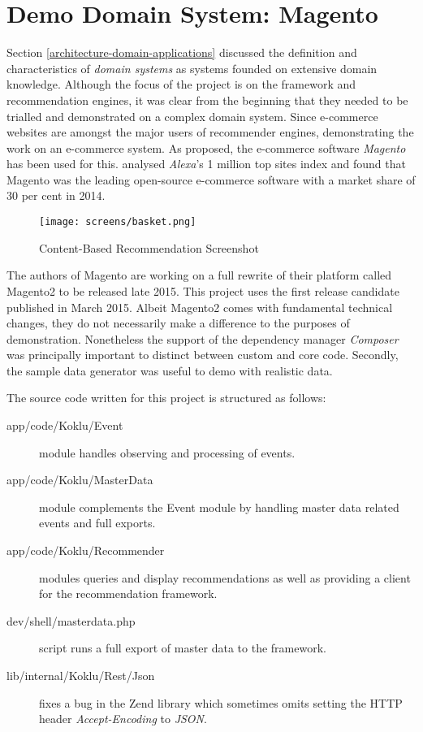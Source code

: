\section{Demo Domain System: Magento}

Section \ref{architecture-domain-applications} discussed the definition and characteristics of \emph{domain systems} as systems founded on extensive domain knowledge. Although the focus of the project is on the framework and recommendation engines, it was clear from the beginning that they needed to be trialled and demonstrated on a complex domain system. Since e-commerce websites are amongst the major users of recommender engines, demonstrating the work on an e-commerce system. As proposed, the e-commerce software \emph{Magento} has been used for this. \citet{aheadworks14} analysed \emph{Alexa}'s 1 million top sites index and found that Magento was the leading open-source e-commerce software with a market share of 30 per cent in 2014.

\begin{figure}[!ht]
    \texttt{[image: screens/basket.png]}
    \caption{Content-Based Recommendation Screenshot}
    \label{fig:implementation-magento-basket}
\end{figure}

The authors of Magento are working on a full rewrite of their platform called Magento2 to be released late 2015. This project uses the first release candidate published in March 2015. Albeit Magento2 comes with fundamental technical changes, they do not necessarily make a difference to the purposes of demonstration. Nonetheless the support of the dependency manager \emph{Composer} was principally important to distinct between custom and core code. Secondly, the sample data generator was useful to demo with realistic data.

The source code written for this project is structured as follows:

\begin{description}
    \item[app/code/Koklu/Event] module handles observing and processing of events.
    \item[app/code/Koklu/MasterData] module complements the Event module by handling master data related events and full exports.
    \item[app/code/Koklu/Recommender] modules queries and display recommendations as well as providing a client for the recommendation framework.
    \item[dev/shell/masterdata.php] script runs a full export of master data to the framework.
    \item[lib/internal/Koklu/Rest/Json] fixes a bug in the Zend library which sometimes omits setting the HTTP header \emph{Accept-Encoding} to \emph{JSON}.
\end{description}

